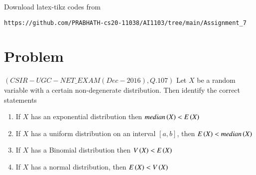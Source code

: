 \documentclass[journal,12pt,twocolumn]{IEEEtran}
\begin{document}
Download latex-tikz codes from
\begin{lstlisting}
https://github.com/PRABHATH-cs20-11038/AI1103/tree/main/Assignment_7
\end{lstlisting}

\section{Problem}

$(CSIR-UGC-NET\_EXAM (Dec-2016), Q.107)$ Let $X$ be a random variable with a certain non-degenerate distribution. Then identify the correct statements
\begin{enumerate}[1.]
    \item If $X$ has an exponential distribution then $median\left(X\right)<E\left(X\right)$
    \item If $X$ has a uniform distribution on an interval $[a,b]$, then $E\left(X\right)<median\left(X\right)$
    \item If $X$ has a Binomial distribution then $V\left(X\right)<E\left(X\right)$
    \item If $X$ has a normal distribution, then $E\left(X\right)<V\left(X\right)$
\end{enumerate}
\end{document}

